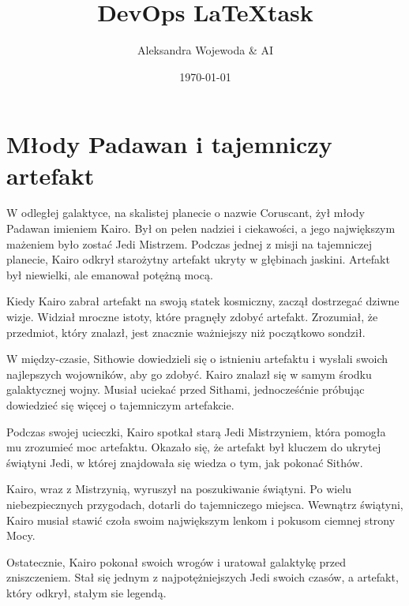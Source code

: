\documentclass[11pt]{article}
\title{DevOps \LaTeX task}
\author{Aleksandra Wojewoda \& AI}
\date{\today}
\begin{document}
\maketitle  

\pagebreak



\section{Młody Padawan i tajemniczy artefakt}


W odległej galaktyce, na skalistej planecie o nazwie Coruscant, żył 
młody Padawan imieniem Kairo. Był on pełen nadziei i ciekawości, 
a jego największym mażeniem było zostać Jedi Mistrzem. 
Podczas jednej z misji na tajemniczej planecie, Kairo odkrył starożytny 
artefakt ukryty w głębinach jaskini. 
Artefakt był niewielki, ale emanował potężną mocą.

Kiedy Kairo zabrał artefakt na swoją statek kosmiczny, zaczął dostrzegać 
dziwne wizje. Widział mroczne istoty, które pragnęły zdobyć artefakt. 
Zrozumiał, że przedmiot, który znalazł, jest znacznie ważniejszy niż 
początkowo sondził.

W między-czasie, Sithowie dowiedzieli się o istnieniu artefaktu i wysłali 
swoich najlepszych wojowników, aby go zdobyć. 
Kairo znalazł się w samym środku galaktycznej wojny. 
Musiał uciekać przed Sithami, jednocześćnie próbując dowiedzieć się 
więcej o tajemniczym artefakcie.

Podczas swojej ucieczki, Kairo spotkał starą Jedi Mistrzyniem,
która pomogła mu zrozumieć moc artefaktu. 
Okazało się, że artefakt był kluczem do ukrytej świątyni Jedi, 
w której znajdowała się wiedza o tym, jak pokonać Sithów.

Kairo, wraz z Mistrzynią, wyruszył na poszukiwanie świątyni. 
Po wielu niebezpiecznych przygodach, dotarli do tajemniczego miejsca. 
Wewnątrz świątyni, Kairo musiał stawić czoła swoim największym lenkom 
i pokusom ciemnej strony Mocy.

Ostatecznie, Kairo pokonał swoich wrogów i uratował galaktykę przed 
zniszczeniem. 
Stał się jednym z najpotężniejszych Jedi swoich czasów, 
a artefakt, który odkrył, stałym sie legendą.


\end{document}
